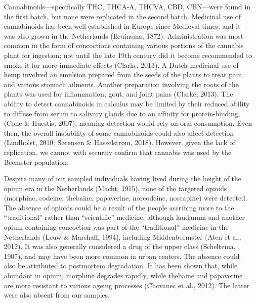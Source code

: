 \documentclass[
  letterpaper,
]{book}
\begin{document}
Cannabinoids---specifically THC, THCA-A, THCVA, CBD, CBN---were found in
the first batch, but none were replicated in the second batch. Medicinal
use of cannabinoids has been well-established in Europe since
Medieval-times, and it was also grown in the Netherlands (Bruinsma,
1872). Administration was most common in the form of concoctions
containing various portions of the cannabis plant for ingestion; not
until the late 19th century did it become recommended to smoke it for
more immediate effects (Clarke, 2013). A Dutch medicinal use of hemp
involved an emulsion prepared from the seeds of the plants to treat pain
and various stomach ailments. Another preparation involving the roots of
the plants was used for inflammation, gout, and joint pains (Clarke,
2013). The ability to detect cannabinoids in calculus may be limited by
their reduced ability to diffuse from serum to salivary glands due to an
affinity for protein-binding, (Cone \& Huestis, 2007), meaning detection
would rely on oral consumption. Even then, the overall instability of
some cannabinoids could also affect detection (Lindholst, 2010; Sørensen
\& Hasselstrøm, 2018). However, given the lack of replication, we cannot
with security confirm that cannabis was used by the Beemster population.

Despite many of our sampled individuals having lived during the height
of the opium era in the Netherlands (Macht, 1915), none of the targeted
opioids (morphine, codeine, thebaine, papaverine, norcodeine, noscapine)
were detected. The absence of opioids could be a result of the people
ascribing more to the ``traditional'' rather than ``scientific''
medicine, although laudanum and another opium containing concoction was
part of the ``traditional'' medicine in the Netherlands (Leuw \&
Marshall, 1994), including Middenbeemster (Aten et al., 2012). It was
also generally considered a drug of the upper class (Scheltema, 1907),
and may have been more common in urban centers. The absence could also
be attributed to postmortem degradation. It has been shown that, while
abundant in opium, morphine degrades rapidly, while thebaine and
papaverine are more resistant to various ageing processes (Chovanec et
al., 2012). The latter were also absent from our samples.
\end{document}
